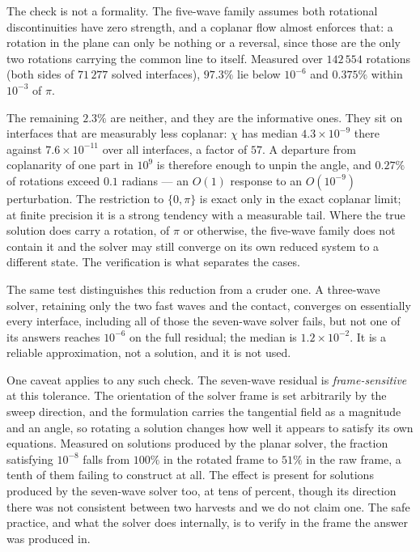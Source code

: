 The check is not a formality. The five-wave family assumes both rotational
discontinuities have zero strength, and a coplanar flow almost enforces that:
a rotation in the plane can only be nothing or a reversal, since those are the
only two rotations carrying the common line to itself. Measured over
$142\,554$ rotations (both sides of $71\,277$ solved interfaces), $97.3\%$
lie below $10^{-6}$ and $0.375\%$ within $10^{-3}$ of $\pi$.

The remaining $2.3\%$ are neither, and they are the informative ones. They sit
on interfaces that are measurably less coplanar: $\chi$ has median
$4.3\times10^{-9}$ there against $7.6\times10^{-11}$ over all interfaces, a
factor of $57$. A departure from coplanarity of one part in $10^{9}$ is
therefore enough to unpin the angle, and $0.27\%$ of rotations exceed $0.1$
radians --- an $O(1)$ response to an $O(10^{-9})$ perturbation. The
restriction to $\{0,\pi\}$ is exact only in the exact coplanar limit; at
finite precision it is a strong tendency with a measurable tail. Where the
true solution does carry a rotation, of $\pi$ or otherwise, the five-wave
family does not contain it and the solver may still converge on its own
reduced system to a different state. The verification is what separates the
cases.

The same test distinguishes this reduction from a cruder one. A three-wave
solver, retaining only the two fast waves and the contact, converges on
essentially every interface, including all of those the seven-wave solver
fails, but not one of its answers reaches $10^{-6}$ on the full residual; the
median is $1.2 \times 10^{-2}$. It is a reliable approximation, not a solution,
and it is not used.

One caveat applies to any such check. The seven-wave residual is
\emph{frame-sensitive} at this tolerance. The orientation of the solver frame
is set arbitrarily by the sweep direction, and the formulation carries the
tangential field as a magnitude and an angle, so rotating a solution changes
how well it appears to satisfy its own equations. Measured on solutions
produced by the planar solver, the fraction satisfying $10^{-8}$ falls from
$100\%$ in the rotated frame to $51\%$ in the raw frame, a tenth of them
failing to construct at all. The effect is present for solutions produced by
the seven-wave solver too, at tens of percent, though its direction there was
not consistent between two harvests and we do not claim one. The safe
practice, and what the solver does internally, is to verify in the frame the
answer was produced in.

